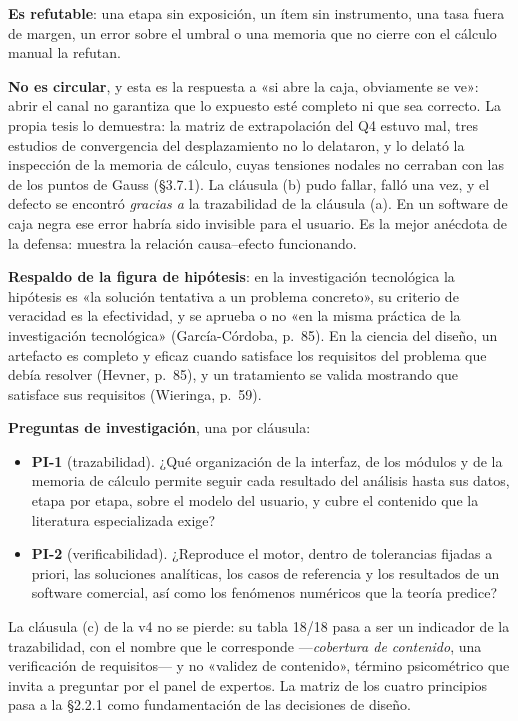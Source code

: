 \documentclass[11pt,a4paper]{article}
\begin{document}
\textbf{Es refutable}: una etapa sin exposición, un ítem sin instrumento, una tasa fuera de margen, un error sobre el umbral o una memoria que no cierre con el cálculo manual la refutan.

\textbf{No es circular}, y esta es la respuesta a «si abre la caja, obviamente se ve»: abrir el canal no garantiza que lo expuesto esté completo ni que sea correcto. La propia tesis lo demuestra: la matriz de extrapolación del Q4 estuvo mal, tres estudios de convergencia del desplazamiento no lo delataron, y lo delató la inspección de la memoria de cálculo, cuyas tensiones nodales no cerraban con las de los puntos de Gauss (§3.7.1). La cláusula (b) pudo fallar, falló una vez, y el defecto se encontró \emph{gracias a} la trazabilidad de la cláusula (a). En un software de caja negra ese error habría sido invisible para el usuario. Es la mejor anécdota de la defensa: muestra la relación causa--efecto funcionando.

\textbf{Respaldo de la figura de hipótesis}: en la investigación tecnológica la hipótesis es «la solución tentativa a un problema concreto», su criterio de veracidad es la efectividad, y se aprueba o no «en la misma práctica de la investigación tecnológica» (García-Córdoba, p.~85). En la ciencia del diseño, un artefacto es completo y eficaz cuando satisface los requisitos del problema que debía resolver (Hevner, p.~85), y un tratamiento se valida mostrando que satisface sus requisitos (Wieringa, p.~59).

\textbf{Preguntas de investigación}, una por cláusula:
\begin{itemize}
\item \textbf{PI-1} (trazabilidad). ¿Qué organización de la interfaz, de los módulos y de la memoria de cálculo permite seguir cada resultado del análisis hasta sus datos, etapa por etapa, sobre el modelo del usuario, y cubre el contenido que la literatura especializada exige?
\item \textbf{PI-2} (verificabilidad). ¿Reproduce el motor, dentro de tolerancias fijadas a priori, las soluciones analíticas, los casos de referencia y los resultados de un software comercial, así como los fenómenos numéricos que la teoría predice?
\end{itemize}

La cláusula (c) de la v4 no se pierde: su tabla 18/18 pasa a ser un indicador de la trazabilidad, con el nombre que le corresponde —\emph{cobertura de contenido}, una verificación de requisitos— y no «validez de contenido», término psicométrico que invita a preguntar por el panel de expertos. La matriz de los cuatro principios pasa a la §2.2.1 como fundamentación de las decisiones de diseño.
\end{document}
